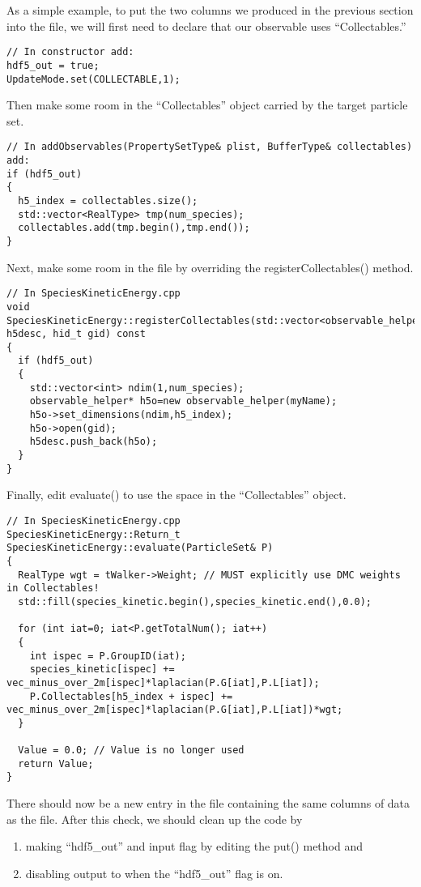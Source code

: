 As a simple example, to put the two columns we produced in the previous section into the  file, we will first need to declare that our observable uses ``Collectables.''
\begin{lstlisting}[style=C++]
// In constructor add: 
hdf5_out = true;
UpdateMode.set(COLLECTABLE,1);
\end{lstlisting}
Then make some room in the ``Collectables'' object carried by the target particle set.
\begin{lstlisting}[style=C++]
// In addObservables(PropertySetType& plist, BufferType& collectables) add:
if (hdf5_out)
{
  h5_index = collectables.size();
  std::vector<RealType> tmp(num_species);
  collectables.add(tmp.begin(),tmp.end());
}
\end{lstlisting}
Next, make some room in the  file by overriding the registerCollectables() method.
\begin{lstlisting}[style=C++]
// In SpeciesKineticEnergy.cpp
void SpeciesKineticEnergy::registerCollectables(std::vector<observable_helper*>& h5desc, hid_t gid) const
{
  if (hdf5_out)
  {
    std::vector<int> ndim(1,num_species);
    observable_helper* h5o=new observable_helper(myName);
    h5o->set_dimensions(ndim,h5_index);
    h5o->open(gid);
    h5desc.push_back(h5o);
  }
}
\end{lstlisting}
Finally, edit evaluate() to use the space in the ``Collectables'' object.
\begin{lstlisting}[style=C++]
// In SpeciesKineticEnergy.cpp
SpeciesKineticEnergy::Return_t SpeciesKineticEnergy::evaluate(ParticleSet& P)
{
  RealType wgt = tWalker->Weight; // MUST explicitly use DMC weights in Collectables!
  std::fill(species_kinetic.begin(),species_kinetic.end(),0.0);

  for (int iat=0; iat<P.getTotalNum(); iat++)
  {
    int ispec = P.GroupID(iat);
    species_kinetic[ispec] += vec_minus_over_2m[ispec]*laplacian(P.G[iat],P.L[iat]);
    P.Collectables[h5_index + ispec] += vec_minus_over_2m[ispec]*laplacian(P.G[iat],P.L[iat])*wgt;
  }

  Value = 0.0; // Value is no longer used
  return Value;
}
\end{lstlisting}
There should now be a new entry in the  file containing the same columns of data as the  file. After this check, we should clean up the code by
\begin{enumerate}
\item making ``hdf5\_out'' and input flag by editing the put() method and
\item disabling output to  when the ``hdf5\_out'' flag is on.
\end{enumerate}


